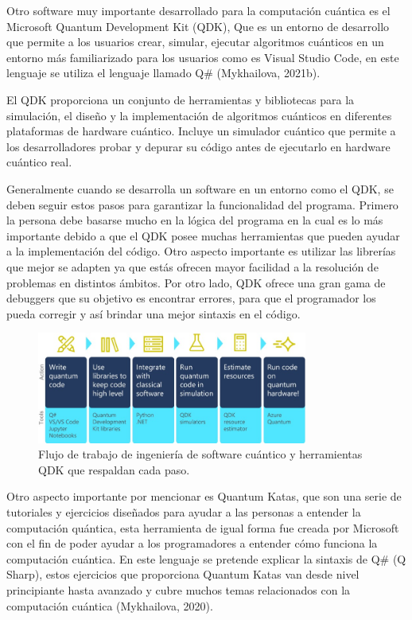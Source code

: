 \documentclass[twoside]{article}
\begin{document}
Otro software muy importante desarrollado para la computación cuántica es el Microsoft Quantum Development Kit (QDK), Que es un entorno de desarrollo que permite a los usuarios crear, simular, ejecutar algoritmos cuánticos en un entorno más familiarizado para los usuarios como es Visual Studio Code, en este lenguaje se utiliza el lenguaje llamado Q\# (Mykhailova, 2021b).

El QDK proporciona un conjunto de herramientas y bibliotecas para la simulación, el diseño y la implementación de algoritmos cuánticos en diferentes plataformas de hardware cuántico. Incluye un simulador cuántico que permite a los desarrolladores probar y depurar su código antes de ejecutarlo en hardware cuántico real. 

Generalmente cuando se desarrolla un software en un entorno como el QDK, se deben seguir estos pasos para garantizar la funcionalidad del programa. Primero la persona debe basarse mucho en la lógica del programa en la cual es lo más importante debido a que el QDK posee muchas herramientas que pueden ayudar a la implementación del código. Otro aspecto importante es utilizar las librerías que mejor se adapten ya que estás ofrecen mayor facilidad a la resolución de problemas en distintos ámbitos. Por otro lado, QDK ofrece una gran gama de debuggers que su objetivo es encontrar errores, para que el programador los pueda corregir y así brindar una mejor sintaxis en el código.  


\begin{figure}[htb]
    \centering
    \includegraphics[width=3.5in]{QDK.jpg}
    \caption{Flujo de trabajo de ingeniería de software cuántico y herramientas QDK que respaldan cada paso.}
    \label{fig:quantum}
\end{figure}

Otro aspecto importante por mencionar es Quantum Katas, que son una serie de tutoriales y ejercicios diseñados para ayudar a las personas a entender la computación quántica, esta herramienta de igual forma fue creada por Microsoft con el fin de poder ayudar a los programadores a entender cómo funciona la computación cuántica. En este lenguaje se pretende explicar la sintaxis de Q\# (Q Sharp), estos ejercicios que proporciona Quantum Katas van desde nivel principiante hasta avanzado y cubre muchos temas relacionados con la computación cuántica (Mykhailova, 2020).
\end{document}
